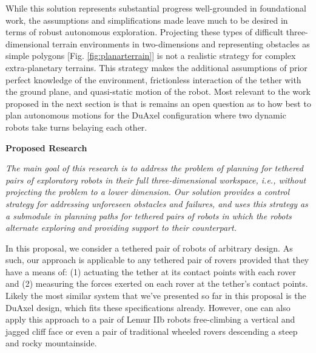 \documentclass[12pt]{article}
\begin{document}
While this solution represents substantial progress well-grounded in foundational work, the 
assumptions and simplifications made leave much to be desired in terms of robust autonomous
exploration. Projecting these types of difficult three-dimensional terrain environments in two-dimensions and representing obstacles as simple polygons [Fig. \ref{fig:planarterrain}] is not a realistic strategy for complex extra-planetary terrains. 
This strategy makes the additional assumptions of prior perfect knowledge of the environment, frictionless 
interaction of the tether with the ground plane, and quasi-static motion of the robot. 
Most relevant to the work proposed in the next section is that is remains an open question as to how 
best to plan autonomous motions for the DuAxel configuration where two 
dynamic robots take turns belaying each other.


{\bf\noindent Proposed Research}

{\sl The main goal of this research is to address the problem of planning for tethered pairs of exploratory 
robots in their full three-dimensional workspace, i.e., without projecting the problem to a lower dimension. 
Our solution provides a control strategy for addressing unforeseen obstacles and failures, and uses this strategy 
as a submodule in planning paths for tethered pairs of robots in which the robots alternate exploring and providing 
support to their counterpart.}

In this proposal, we consider a tethered pair of robots of arbitrary design. As such, our approach is applicable 
to any tethered pair of rovers provided that they have a means of: (1) actuating the tether at its contact points with 
each rover and (2) measuring the forces exerted on each rover at the tether's contact points. Likely the most similar system 
that we've presented so far in this proposal is the DuAxel design, which fits these specifications already. However, one can 
also apply this approach to a pair of Lemur IIb robots free-climbing a vertical and jagged cliff face or even a pair of traditional 
wheeled rovers descending a steep and rocky mountainside. 
\end{document}
